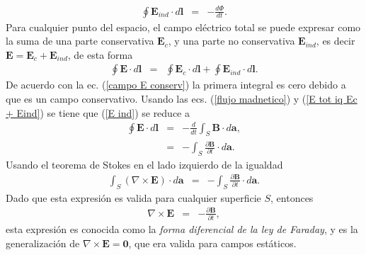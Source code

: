 \begin{eqnarray}
\oint\textbf{E}_{ind}\cdot d\textbf{l}&=&-\frac{d\Phi}{dt}.\label{E ind}
\end{eqnarray}
Para cualquier punto del espacio, el campo el\'ectrico total se puede expresar como la suma de una parte conservativa $\textbf{E}_c$, y una parte no conservativa $\textbf{E}_{ind}$, es decir $\textbf{E}=\textbf{E}_c+\textbf{E}_{ind}$, de esta forma
\begin{eqnarray}
\oint\textbf{E}\cdot d\textbf{l}&=&\oint\textbf{E}_{c}\cdot d\textbf{l}+\oint\textbf{E}_{ind}\cdot d\textbf{l}.\label{E tot iq Ec + Eind}
\end{eqnarray}
De acuerdo con la ec. (\ref{campo E conserv}) la primera integral es cero debido a que es un campo conservativo. Usando las ecs. (\ref{flujo madnetico}) y (\ref{E tot iq Ec + Eind}) se tiene que (\ref{E ind}) se reduce a
\begin{eqnarray}
\oint\textbf{E}\cdot d\textbf{l}&=&-\frac{d}{dt}\int_S\textbf{B}\cdot d\textbf{a},\nonumber\\
&=&-\int_S\frac{\partial\textbf{B}}{\partial t}\cdot d\textbf{a}.\label{e to iq m part B}
\end{eqnarray}
Usando el teorema de Stokes en el lado izquierdo de la igualdad
\begin{eqnarray}
\int_S(\nabla\times\textbf{E})\cdot d\textbf{a}&=&-\int_S\frac{\partial\textbf{B}}{\partial t}\cdot d\textbf{a}.
\end{eqnarray}
Dado que esta expresi\'on es valida para cualquier superficie $S$, entonces
\begin{eqnarray}
\nabla\times\textbf{E}&=&-\frac{\partial\textbf{B}}{\partial t},\label{ley de faraday diferencia}
\end{eqnarray}
esta expresi\'on es conocida como la \emph{forma diferencial de la ley de Faraday}, y es la generalizaci\'on de $\nabla\times \textbf{E}=\textbf{0}$, que era valida para campos est\'aticos.
